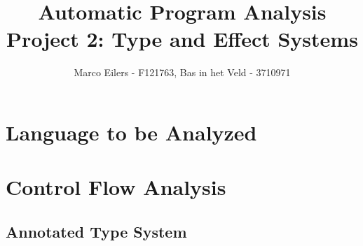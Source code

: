 \documentclass[a4paper,11pt]{article}
\begin{document}
\title{Automatic Program Analysis\\Project 2: Type and Effect Systems}
\author{Marco Eilers - F121763, Bas in het Veld - 3710971}

\maketitle

\section{Language to be Analyzed}


\section{Control Flow Analysis}
\subsection{Annotated Type System}
\begin{prooftree}
\end{prooftree}

\begin{prooftree}
\end{prooftree}

\begin{prooftree}
\end{prooftree}

\begin{prooftree}
\end{prooftree}

\begin{prooftree}
\end{prooftree}
\end{document}
